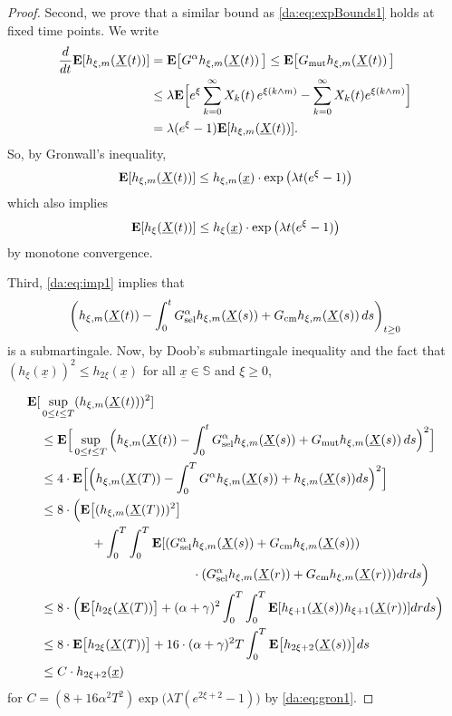 \begin{proof}
\noindent
Second, we prove that a similar bound as
\eqref{da:eq:expBounds1} holds at fixed time points. We write
\begin{align*}
\frac{d}{dt} \mathbf E[h_{\xi,m}(\underline{X} \! \left( t \right))] 
& = \mathbf E\big[ G^{\alpha} h_{\xi,m} \! \left( \underline{X} \! \left( t \right) \right) \big] 
  \leq \mathbf E\big[ G_{\text{mut}} h_{\xi,m} \! \left( \underline{X} \! \left( t \right) \right) \big] \\ 
& \leq \lambda \mathbf E\Big[ e^\xi \sum_{k=0}^\infty X_{k} \! \left( t \right) 
		e^{\xi(k\wedge m)} - \sum_{k=0}^\infty X_k(t) e^{\xi(k\wedge m)}\Big] \\ 
& = \lambda (e^\xi - 1) \mathbf E[h_{\xi,m}(\underline{X} \! \left( t \right))].
\end{align*}
So, by Gronwall's inequality,
\begin{align*}%
\mathbf E[h_{\xi,m}(\mrDifT{t})] 
  \leq h_{\xi,m}(\Vector{x}) \cdot \exp\big( \lambda t(e^\xi - 1)\big)
\end{align*}
which also implies 
\begin{align}\label{da:eq:gron1}
\mathbf E[h_{\xi}(\underline{X} \! \left( t \right))] \leq h_{\xi}(\underline{x}) \cdot \exp\big( \lambda t(e^\xi - 1)\big)
\end{align}
by monotone convergence. 

\noindent
Third, \eqref{da:eq:imp1} implies that
$$ \left( h_{\xi,m}(\underline{X} \! \left( t \right)) - 
	\int_0^t G^{\alpha}_{\text{sel}} h_{\xi,m} \! \left( \underline{X} \! \left( s \right) \right) + G_{\text{cm}} h_{\xi,m} \! \left( \underline{X} \! \left( s \right) \right) ds \right)_{t\geq 0} $$
is a submartingale. Now, by Doob's submartingale inequality and the fact that 
$(h_\xi(\underline x))^2 \leq h_{2\xi}(\underline x)$ for all $\underline x\in\mathbb S$ and
$\xi\geq 0$,
 
\begin{align*}
\mathbf E[&\sup_{0\leq t\leq T} (h_{\xi,m} (\mrDifT{t}))^2]\\
&  \leq \mathbf E\Big[\sup_{0\leq t\leq T} \Big(h_{\xi,m} (\mrDifT{t}) 
  	- \int_0^t \GAselFX{h_{\xi,m}}{\mrDifT{s}} + \GAmutFX{h_{\xi,m}}{\mrDifT{s}} ds\Big)^2\Big] \\
& \leq 4 \cdot \mathbf E\Big[\Big(h_{\xi,m} (\mrDifT{T}) 
	- \int_0^T \GAFX{h_{\xi,m}}{\mrDifT{s}} + h_{\xi,m}(\mrDifT{s}) ds\Big)^2\Big] \\ 
& \leq 8 \cdot \Big(\mathbf E\big[ (h_{\xi,m}(\mrDifT{T}))^2\big] \\ 
& \qquad \qquad + \int_0^T \int_0^T \mathbf E[(\GAselFX{h_{\xi,m}}{\mrDifT{s}}+
											   \GAcompFX{h_{\xi,m}}{\mrDifT{s}}) \\ 
& \qquad \qquad \qquad \qquad \qquad \qquad \cdot (\GAselFX{h_{\xi,m}}{\mrDifT{r}}+
											   \GAcompFX{h_{\xi,m}}{\mrDifT{r}})dr ds\Big) \\ 
& \leq 8 \cdot \Big(\mathbf E\big[ h_{2\xi}(\mrDifT{T})\big] + (\alpha + \gamma)^2 
	\int_0 ^T \int_0^T \mathbf E[h_{\xi+1}(\mrDifT{s}) h_{\xi+1}(\mrDifT{r})] dr ds \Big)\\ 
& \leq 8 \cdot \mathbf E\big[ h_{2\xi}(\mrDifT{T})\big] + 16 \cdot (\alpha + \gamma)^2 T
	\int_0^T \mathbf E\big[ h_{2\xi+2}(\mrDifT{s})\big]ds \\ 
& \leq C\cdot h_{2\xi+2}(\underline x)
\end{align*}
for $C = (8+16\alpha^2 T^2) \exp\big(\lambda T(e^{2\xi+2}-1)\big)$ by \eqref{da:eq:gron1}.
\end{proof}

